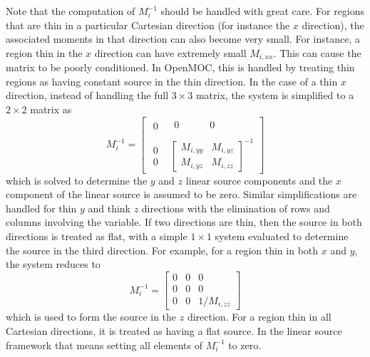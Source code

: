 Note that the computation of $M_i^{-1}$ should be handled with great care. For regions that are thin in a particular Cartesian direction (for instance the $x$ direction), the associated moments in that direction can also become very small. For instance, a region thin in the $x$ direction can have extremely small $M_{i,xx}$. This can cause the matrix to be poorly conditioned. In OpenMOC, this is handled by treating thin regions as having constant source in the thin direction. In the case of a thin $x$ direction, instead of handling the full $3 \times 3$ matrix, the system is simplified to a $2 \times 2$ matrix as
\begin{equation*}
	M_i^{-1} = 
	\begin{bmatrix}
		\begin{matrix}
			0  
		\end{matrix}
			& \begin{matrix} 
			 0\phantom{M_{i,yy}}  & 0\phantom{M_{i,yz}}
			 \end{matrix} \\
	    \begin{matrix} 
	    	0 \\ 0 
		\end{matrix}
		      & \begin{bmatrix}
				M_{i,yy}  & M_{i,yz} \\
				M_{i,yz}  & M_{i,zz}
			\end{bmatrix}^{-1}
	\end{bmatrix}
\end{equation*}
which is solved to determine the $y$ and $z$ linear source components and the $x$ component of the linear source is assumed to be zero. Similar simplifications are handled for thin $y$ and think $z$ directions with the elimination of rows and columns involving the variable. If two directions are thin, then the source in both directions is treated as flat, with a simple $1\times1$ system evaluated to determine the source in the third direction. For example, for a region thin in both $x$ and $y$, the system reduces to
\begin{equation*}
	M_i^{-1} = 
	\begin{bmatrix}
		0 & 0  & 0 \\
		0 & 0  & 0 \\
		0 & 0  & 1 / M_{i,zz}
	\end{bmatrix}
\end{equation*}
which is used to form the source in the $z$ direction. For a region thin in all Cartesian directions, it is treated as having a flat source. In the linear source framework that means setting all elements of $M_i^{-1}$ to zero.

